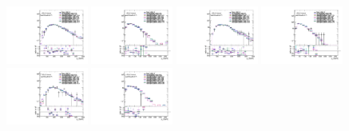 \begin{figure}[htbp!]
\begin{center}
\includegraphics[width=0.24\textwidth,angle=-90]{figures/boosted/AppendixReweight/Compare/Data_FourTag_Sideband_directcompare_leadHCand_trk0_Pt_1.pdf}
\includegraphics[width=0.24\textwidth,angle=-90]{figures/boosted/AppendixReweight/Compare/Data_FourTag_Sideband_directcompare_leadHCand_trk1_Pt_1.pdf}
\includegraphics[width=0.24\textwidth,angle=-90]{figures/boosted/AppendixReweight/Compare/Data_FourTag_Sideband_directcompare_sublHCand_trk0_Pt_1.pdf}
\includegraphics[width=0.24\textwidth,angle=-90]{figures/boosted/AppendixReweight/Compare/Data_FourTag_Sideband_directcompare_sublHCand_trk1_Pt_1.pdf}\\
\includegraphics[width=0.24\textwidth,angle=-90]{figures/boosted/AppendixReweight/Compare/Data_FourTag_Control_directcompare_leadHCand_trk0_Pt_1.pdf}
\includegraphics[width=0.24\textwidth,angle=-90]{figures/boosted/AppendixReweight/Compare/Data_FourTag_Control_directcompare_leadHCand_trk1_Pt_1.pdf}

\end{center}
\end{figure}
